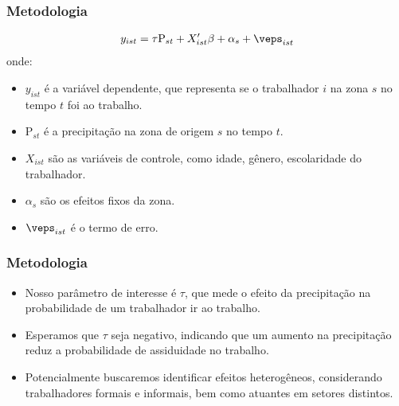 \begin{frame}
    \frametitle{Metodologia}
    \begin{align*}
    y_{ist} &= \tau \text{P}_{st} + X_{ist}'\beta + \alpha_{s} + \veps_{ist} \\ 
    \end{align*}
    onde:
    \begin{itemize}
        \item $y_{ist}$ é a variável dependente, que representa se o trabalhador $i$ na zona $s$ no tempo $t$ foi ao trabalho.
        \item $\text{P}_{st}$ é a precipitação na zona de origem $s$ no tempo $t$.
        \item $X_{ist}$ são as variáveis de controle, como idade, gênero, escolaridade do trabalhador.
        \item $\alpha_{s}$ são os efeitos fixos da zona.
        \item $\veps_{ist}$ é o termo de erro.
    \end{itemize}
\end{frame}

\begin{frame}
    \frametitle{Metodologia}
    \begin{itemize}
        \item Nosso parâmetro de interesse é $\tau$, que mede o efeito da precipitação na probabilidade de um trabalhador ir ao trabalho.
        \item Esperamos que $\tau$ seja negativo, indicando que um aumento na precipitação reduz a probabilidade de assiduidade no trabalho.
        \item Potencialmente buscaremos identificar efeitos heterogêneos, considerando trabalhadores formais e informais, bem como atuantes em setores distintos.
    \end{itemize}
\end{frame}